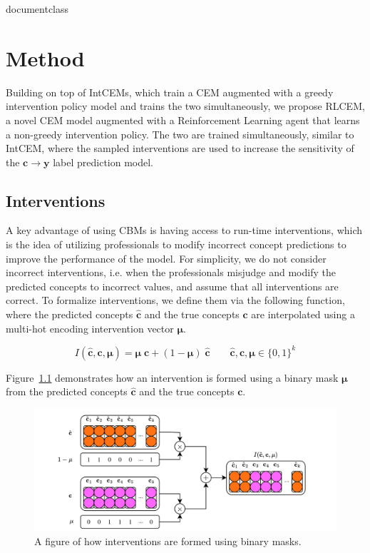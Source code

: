 \csname documentclass

\chapter{Method}

Building on top of IntCEMs, which train a CEM
augmented with a greedy intervention policy model and trains the two simultaneously,
we propose RLCEM,
a novel CEM model augmented with a Reinforcement Learning agent
that learns a non-greedy intervention policy.
The two are trained simultaneously, similar to IntCEM, 
where the sampled interventions are used to increase the sensitivity of the
$\mathbf{c} \to \mathbf{y}$ label prediction model.

\section{Interventions}

A key advantage of using CBMs is having access to 
run-time interventions, which is the idea of utilizing professionals
to modify incorrect concept predictions to improve the 
performance of the model.
For simplicity, we do not consider incorrect interventions, 
i.e. when the professionals misjudge and modify
 the predicted concepts to incorrect values,
and assume that
all interventions are correct. To formalize interventions, we define
them via the following function, where
the predicted concepts $\hat{\mathbf{c}}$ and the true concepts $\mathbf{c}$ are interpolated
using a multi-hot encoding intervention vector $\bm{\mu}$.

\[I(\hat{\mathbf{c}}, \mathbf{c}, \bm{\mu}) = 
\bm{\mu} \; \mathbf{c} + (1 - \bm{\mu}) \; \hat{\mathbf{c}} \qquad \hat{\mathbf{c}}, \mathbf{c}, \bm{\mu} \in \{0, 1\}^k\]

Figure~\ref{fig:interventions} demonstrates how an intervention
is formed using 
a binary mask $\bm{\mu}$ from the predicted concepts $\hat{\mathbf{c}}$ and the true concepts $\mathbf{c}$.

\begin{figure}[!h]
    \centering
    \includegraphics[width=\textwidth]{figs/method/interventions.png}
    \caption{A figure of how interventions are formed using binary masks.}
    \label{fig:interventions}
\end{figure}

